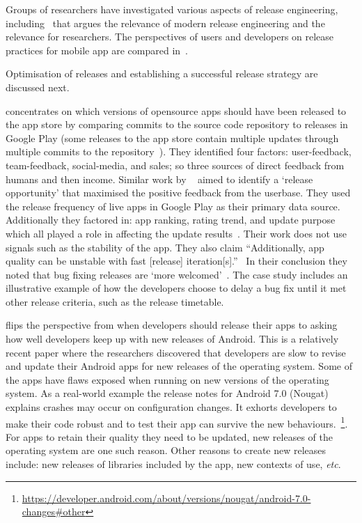 Groups of researchers have investigated various aspects of release engineering, including~ that argues the relevance of modern release engineering and the relevance for researchers. The perspectives of users and developers on release practices for mobile app are compared in~.

Optimisation of releases and establishing a successful release strategy are discussed next. 

 concentrates on which versions of opensource apps should have been released to the app store by comparing commits to the source code repository to releases in Google Play (some releases to the app store contain multiple updates through multiple commits to the repository~). They identified four factors: user-feedback, team-feedback, social-media, and sales; so three sources of direct feedback from humans and then income. Similar work by ~ aimed to identify a `release opportunity' that maximised the positive feedback from the userbase. They used the release frequency of live apps in Google Play as their primary data source. Additionally they factored in: app ranking, rating trend, and update purpose which all played a role in affecting the update results~. Their work does not use signals such as the stability of the app. They also claim ``Additionally, app quality can be unstable with fast [release] iteration[s].''~ In their conclusion they noted that bug fixing releases are `more welcomed'~. The  case study includes an illustrative example of how the developers choose to delay a bug fix until it met other release criteria, such as the release timetable. %


 flips the perspective from when developers should release their apps to asking how well developers keep up with new releases of Android. This is a relatively recent paper where the researchers discovered that developers are slow to revise and update their Android apps for new releases of the operating system. Some of the apps have flaws exposed when running on new versions of the operating system. As a real-world example the release notes for Android 7.0 (Nougat) explains crashes may occur on configuration changes. It exhorts developers to make their code robust and to test their app can survive the new behaviours.~\footnote{\url{https://developer.android.com/about/versions/nougat/android-7.0-changes\#other}}.
For apps to retain their quality they need to be updated, new releases of the operating system are one such reason. Other reasons to create new releases include: new releases of libraries included by the app, new contexts of use, \emph{etc}.

